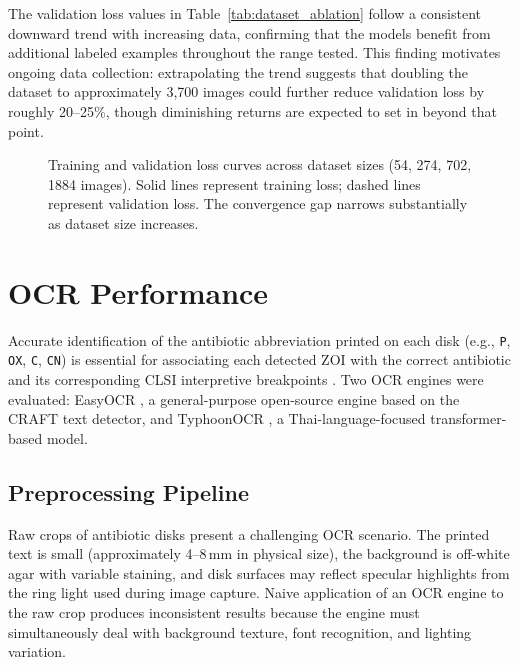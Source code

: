 The validation loss values in Table~\ref{tab:dataset_ablation}
follow a consistent downward trend with increasing data,
confirming that the models benefit from additional labeled examples
throughout the range tested.
This finding motivates ongoing data collection:
extrapolating the trend suggests that doubling the dataset to approximately 3,700 images
could further reduce validation loss by roughly 20--25\%,
though diminishing returns are expected to set in beyond that point.

\begin{figure}[H]
  \centering
  \caption{Training and validation loss curves across dataset sizes (54, 274, 702, 1884 images).
           Solid lines represent training loss; dashed lines represent validation loss.
           The convergence gap narrows substantially as dataset size increases.}
  \label{fig:training_curves}
\end{figure}

\section{OCR Performance}
\label{sec:ocr_performance}

Accurate identification of the antibiotic abbreviation printed on each disk
(e.g., \texttt{P}, \texttt{OX}, \texttt{C}, \texttt{CN}) is essential for
associating each detected ZOI with the correct antibiotic and its corresponding
CLSI interpretive breakpoints \cite{clsi2025}.
Two OCR engines were evaluated: EasyOCR \cite{baek2019craft,jaidedai2024easyocr},
a general-purpose open-source engine based on the CRAFT text detector,
and TyphoonOCR \cite{typhoonocr2025}, a Thai-language-focused transformer-based model.

\subsection{Preprocessing Pipeline}

Raw crops of antibiotic disks present a challenging OCR scenario.
The printed text is small (approximately 4--8\,mm in physical size),
the background is off-white agar with variable staining,
and disk surfaces may reflect specular highlights from the ring light
used during image capture.
Naive application of an OCR engine to the raw crop produces inconsistent results
because the engine must simultaneously deal with background texture,
font recognition, and lighting variation.

